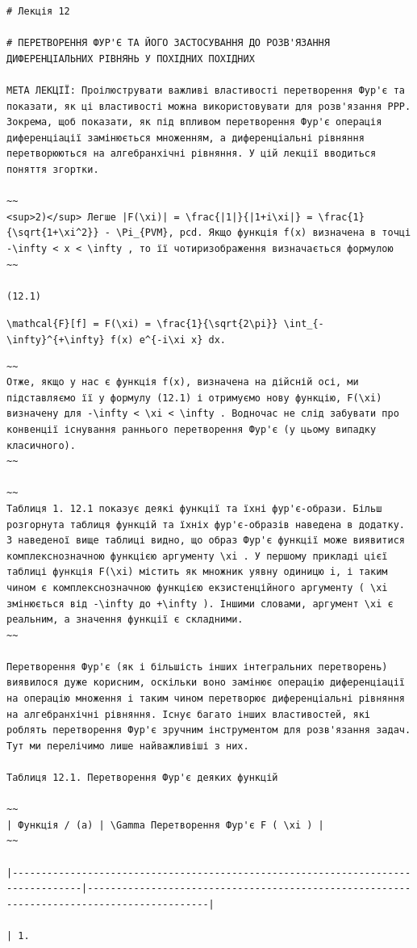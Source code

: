 \documentclass[
  ukrainian,
]{article}
\begin{document}
\begin{verbatim}
# Лекція 12

# ПЕРЕТВОРЕННЯ ФУР'Є ТА ЙОГО ЗАСТОСУВАННЯ ДО РОЗВ'ЯЗАННЯ ДИФЕРЕНЦІАЛЬНИХ РІВНЯНЬ У ПОХІДНИХ ПОХІДНИХ

МЕТА ЛЕКЦІЇ: Проілюструвати важливі властивості перетворення Фур'є та показати, як ці властивості можна використовувати для розв'язання PPP. Зокрема, щоб показати, як під впливом перетворення Фур'є операція диференціації замінюється множенням, а диференціальні рівняння перетворюються на алгебранхічні рівняння. У цій лекції вводиться поняття згортки.

~~
<sup>2)</sup> Легше |F(\xi)| = \frac{|1|}{|1+i\xi|} = \frac{1}{\sqrt{1+\xi^2}} - \Pi_{PVM}, pcd. Якщо функція f(x) визначена в точці -\infty < x < \infty , то її чотиризображення визначається формулою
~~

(12.1)
\end{verbatim}

\texttt{\textbackslash{}mathcal\{F\}{[}f{]}\ =\ F(\textbackslash{}xi)\ =\ \textbackslash{}frac\{1\}\{\textbackslash{}sqrt\{2\textbackslash{}pi\}\}\ \textbackslash{}int\_\{-\textbackslash{}infty\}\^{}\{+\textbackslash{}infty\}\ f(x)\ e\^{}\{-i\textbackslash{}xi\ x\}\ dx.}

\begin{verbatim}
~~
Отже, якщо у нас є функція f(x), визначена на дійсній осі, ми підставляємо її у формулу (12.1) і отримуємо нову функцію, F(\xi) визначену для -\infty < \xi < \infty . Водночас не слід забувати про конвенції існування раннього перетворення Фур'є (у цьому випадку класичного).
~~

~~
Таблиця 1. 12.1 показує деякі функції та їхні фур'є-образи. Більш розгорнута таблиця функцій та їхніх фур'є-образів наведена в додатку. З наведеної вище таблиці видно, що образ Фур'є функції може виявитися комплекснозначною функцією аргументу \xi . У першому прикладі цієї таблиці функція F(\xi) містить як множник уявну одиницю i, і таким чином є комплекснозначною функцією екзистенційного аргументу ( \xi змінюється від -\infty до +\infty ). Іншими словами, аргумент \xi є реальним, а значення функції є складними.
~~

Перетворення Фур'є (як і більшість інших інтегральних перетворень) виявилося дуже корисним, оскільки воно замінює операцію диференціації на операцію множення і таким чином перетворює диференціальні рівняння на алгебранхічні рівняння. Існує багато інших властивостей, які роблять перетворення Фур'є зручним інструментом для розв'язання задач. Тут ми перелічимо лише найважливіші з них.

Таблиця 12.1. Перетворення Фур'є деяких функцій

~~
| Функція / (a) | \Gamma Перетворення Фур'є F ( \xi ) |
~~

|----------------------------------------------------------------------------------|-------------------------------------------------------------------------------------------|

| 1.
\end{verbatim}
\end{document}
